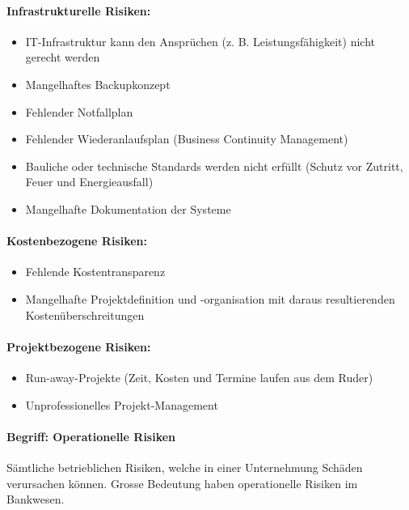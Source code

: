 \documentclass[10pt,a4paper]{article}
\begin{document}
\paragraph*{Infrastrukturelle Risiken:}
\begin{itemize}[noitemsep,topsep=0pt,leftmargin=*]
    \item IT-Infrastruktur kann den Ansprüchen (z. B.
    Leistungsfähigkeit) nicht gerecht werden
    \item Mangelhaftes Backupkonzept
    \item Fehlender Notfallplan
    \item Fehlender Wiederanlaufsplan (Business Continuity
    Management)
    \item Bauliche oder technische Standards werden nicht erfüllt
    (Schutz vor Zutritt, Feuer und Energieausfall)
    \item Mangelhafte Dokumentation der Systeme
\end{itemize}

\paragraph*{Kostenbezogene Risiken:}
\begin{itemize}[noitemsep,topsep=0pt,leftmargin=*]
    \item Fehlende Kostentransparenz
    \item Mangelhafte Projektdefinition und -organisation mit
    daraus resultierenden Kostenüberschreitungen
\end{itemize}

\paragraph*{Projektbezogene Risiken:}
\begin{itemize}[noitemsep,topsep=0pt,leftmargin=*]
    \item Run-away-Projekte (Zeit, Kosten und Termine laufen aus
    dem Ruder)
    \item Unprofessionelles Projekt-Management
\end{itemize}


\paragraph*{Begriff: Operationelle Risiken} Sämtliche betrieblichen Risiken, welche in einer Unternehmung Schäden verursachen können.
Grosse Bedeutung haben operationelle Risiken im Bankwesen.
\end{document}
